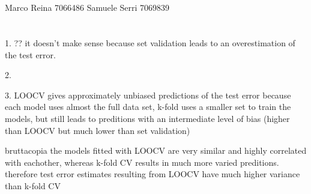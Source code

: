 \documentclass[12pt]{article}
\begin{document}
\section*{}
Marco Reina 7066486 \newline
Samuele Serri 7069839 \newline
\section*{}

1. ?? it doesn't make sense because set validation leads to an overestimation of the test error.

2. 

3. LOOCV gives approximately unbiased predictions of the test error because each model uses almost the full data set,
k-fold uses a smaller set to train the models, but still leads to preditions with an intermediate level of bias (higher than LOOCV but much lower than set validation)


bruttacopia
the models fitted with LOOCV are very similar and highly correlated with eachother, whereas k-fold CV results in much more varied preditions.
therefore test error estimates resulting from LOOCV have much higher variance than k-fold CV
\end{document}
